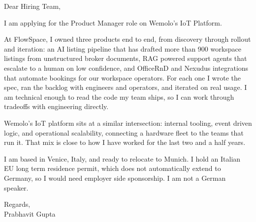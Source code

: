 \documentclass[a4paper,11pt]{article}
\begin{document}
Dear Hiring Team,

I am applying for the Product Manager role on Wemolo's IoT Platform.

At FlowSpace, I owned three products end to end, from discovery through rollout and iteration: an AI listing pipeline that has drafted more than 900 workspace listings from unstructured broker documents, RAG powered support agents that escalate to a human on low confidence, and OfficeRnD and Nexudus integrations that automate bookings for our workspace operators. For each one I wrote the spec, ran the backlog with engineers and operators, and iterated on real usage. I am technical enough to read the code my team ships, so I can work through tradeoffs with engineering directly.

Wemolo's IoT platform sits at a similar intersection: internal tooling, event driven logic, and operational scalability, connecting a hardware fleet to the teams that run it. That mix is close to how I have worked for the last two and a half years.

I am based in Venice, Italy, and ready to relocate to Munich. I hold an Italian EU long term residence permit, which does not automatically extend to Germany, so I would need employer side sponsorship. I am not a German speaker.

Regards,\\
Prabhavit Gupta
\end{document}
